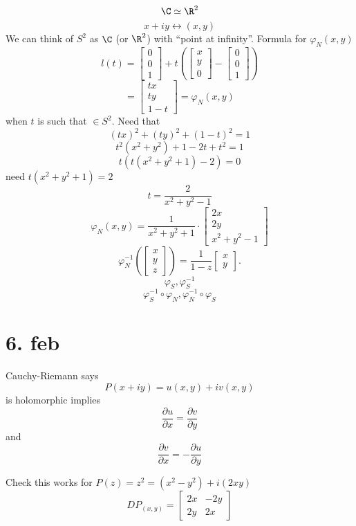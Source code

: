 $$\C\simeq \R^2$$
$$x+iy\leftrightarrow (x,y)$$
We can think of $S^2$ as $\C$ (or $\R^2$) with ``point at infinity''.
\newline Formula for $\varphi_N(x,y)$
  $$l(t)=
\begin{bmatrix}
  0\\
  0\\
  1
\end{bmatrix}+
t \left(
\begin{bmatrix}
  x\\
  y\\
  0
\end{bmatrix}
-
\begin{bmatrix}
  0\\
  0\\
  1
\end{bmatrix}\right)
  $$
$$=
\begin{bmatrix}
  tx \\
  ty\\
  1-t
\end{bmatrix}=\varphi_N(x,y)
$$
when $t$ is such that $\in S^2$.
\newline Need that $$(tx)^2+(ty)^2+(1-t)^2=1$$
$$t^2(x^2+y^2)+1-2t+t^2=1$$
$$t \left(t(x^2+y^2+1)-2\right)=0$$
need $t(x^2+y^2+1)=2$
$$t=\frac{2}{x^2+y^2-1}$$
$$\varphi _N(x,y)=\frac{1}{x^2+y^2+1} \cdot
\begin{bmatrix}
  2x \\
  2y\\
  x^2+y^2-1
\end{bmatrix}$$
$$\varphi _N ^{-1}\left(
\begin{bmatrix}
  x\\
  y\\
  z
\end{bmatrix}
\right)=\frac{1}{1-z}
\begin{bmatrix}
    x\\
    y
\end{bmatrix}.$$
$$\varphi _S,\varphi _S ^{-1}$$
$$\varphi _S ^{-1} \circ \varphi _N, \varphi_N ^{-1} \circ \varphi _S$$

\section{6. feb}
Cauchy-Riemann says
  $$P(x+iy)=u(x,y)+iv(x,y)$$
is holomorphic implies
  $$\frac{\partial u}{\partial x}=\frac{\partial v}{\partial y}$$
  and $$\frac{\partial v}{\partial x}=-\frac{\partial u}{\partial y}$$
\begin{example}
  Check this works for $P(z)=z^2=(x^2-y^2)+i(2xy)$
  $$DP_{(x,y)}=
  \begin{bmatrix}
    2x & -2y \\
    2y & 2x
  \end{bmatrix}$$
\end{example}

